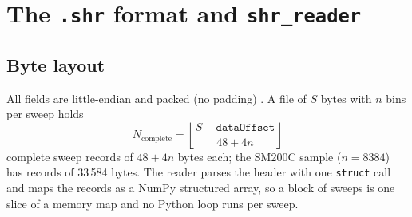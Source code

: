 \documentclass[11pt,a4paper]{article}
\newcommand{\code}[1]{\texttt{#1}}
\begin{document}
\section{\texorpdfstring{The \code{.shr} format and \code{shr\_reader}}{The .shr format and shr\_reader}}\label{sec:format}
\subsection{Byte layout}
All fields are little-endian and packed (no padding) \cite{r1}. A file of $S$ bytes with $n$ bins per sweep
holds
\begin{equation}
N_\mathrm{complete}=\left\lfloor\frac{S-\code{dataOffset}}{48+4n}\right\rfloor
\end{equation}
complete sweep records of $48+4n$ bytes each; the SM200C sample ($n=8384$) has records of 33\,584 bytes. The
reader parses the header with one \code{struct} call and maps the records as a NumPy structured array, so a
block of sweeps is one slice of a memory map and no Python loop runs per sweep.
\end{document}
